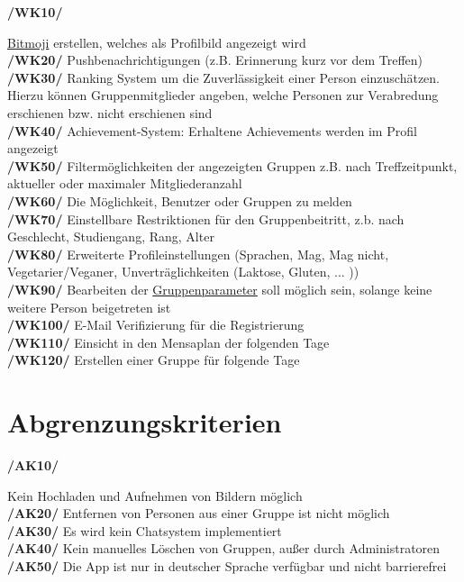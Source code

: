 \documentclass[a4paper]{scrreprt}
\begin{document}
\begin{addmargin}[25pt]{0pt} 
\hypertarget{wk10}{\textbf{/WK10/}} \hyperlink{label7}{Bitmoji} erstellen, welches als Profilbild angezeigt wird \\
\hypertarget{wk20}{\textbf{/WK20/}} Pushbenachrichtigungen (z.B. Erinnerung kurz vor dem Treffen) \\
\hypertarget{wk30}{\textbf{/WK30/}} Ranking System um die Zuverlässigkeit einer Person einzuschätzen.\\ 
Hierzu können Gruppenmitglieder angeben, welche Personen zur Verabredung erschienen bzw. nicht erschienen sind\\
\hypertarget{wk40}{\textbf{/WK40/}} Achievement-System: Erhaltene Achievements werden im Profil angezeigt\\
\hypertarget{wk50}{\textbf{/WK50/}} Filtermöglichkeiten der angezeigten Gruppen z.B. nach Treffzeitpunkt, aktueller oder maximaler Mitgliederanzahl \\
\hypertarget{wk60}{\textbf{/WK60/}} Die Möglichkeit, Benutzer oder Gruppen zu melden\\
\hypertarget{wk70}{\textbf{/WK70/}} Einstellbare Restriktionen für den Gruppenbeitritt, z.b. nach Geschlecht, Studiengang, Rang, Alter \\
\hypertarget{wk80}{\textbf{/WK80/}} Erweiterte Profileinstellungen (Sprachen, Mag, Mag nicht, Vegetarier/Veganer, Unverträglichkeiten (Laktose, Gluten, ... ))\\
\hypertarget{wk90}{\textbf{/WK90/}} Bearbeiten der \hyperlink{label2}{Gruppenparameter} soll möglich sein, solange keine weitere Person beigetreten ist\\
\hypertarget{wk100}{\textbf{/WK100/}} E-Mail Verifizierung für die Registrierung\\
\hypertarget{wk110}{\textbf{/WK110/}} Einsicht in den Mensaplan der folgenden Tage\\
\hypertarget{wk120}{\textbf{/WK120/}} Erstellen einer Gruppe für folgende Tage\\
\end{addmargin}
 
\section{Abgrenzungskriterien}

\begin{addmargin}[25pt]{0pt} 
\hypertarget{ak10}{\textbf{/AK10/}} Kein Hochladen und Aufnehmen von Bildern möglich\\
\hypertarget{ak20}{\textbf{/AK20/}} Entfernen von Personen aus einer Gruppe ist nicht möglich\\
\hypertarget{ak30}{\textbf{/AK30/}} Es wird kein Chatsystem implementiert\\
\hypertarget{ak40}{\textbf{/AK40/}} Kein manuelles Löschen von Gruppen, außer durch Administratoren\\
\hypertarget{ak50}{\textbf{/AK50/}} Die App ist nur in deutscher Sprache verfügbar und nicht barrierefrei\\
\end{addmargin}
\end{document}
